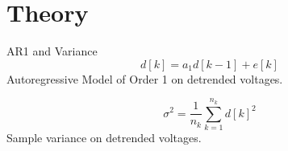 \section[Theory]{Theory}
\label{sec:theory}

\begin{frame}{AR1 and Variance}
	\begin{equation}
		\label{eq:autocorrDef}
		d[k] = a_1 d[k-1] + e[k]
	\end{equation} 
	Autoregressive Model of Order 1 on detrended voltages.
	
	\begin{equation}
		\label{eq:varDef}
		\sigma^2 = \frac{1}{n_k} \sum_{k=1}^{n_k} d[k]^2
	\end{equation} 
	Sample variance on detrended voltages.
\end{frame}